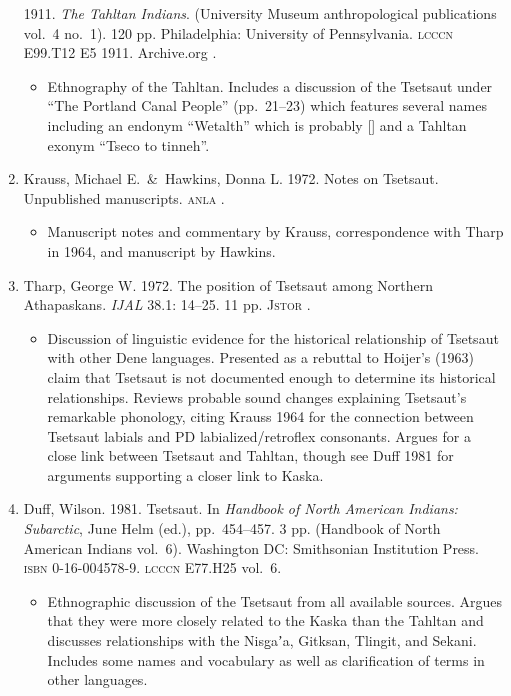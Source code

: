 \documentclass[12pt,letterpaper,oneside,article]{memoir}
\begin{document}
\begin{enumerate}
	1911.
	\textit{The Tahltan Indians}.
	(University Museum anthropological publications vol.\ 4 no.\ 1).
	120 pp. 
	Philadelphia: University of Pennsylvania.
	\textsc{lcccn} E99.T12 E5 1911.
	Archive.org .
	\begin{itemize}
	\item	Ethnography of the Tahltan.
		Includes a discussion of the Tsetsaut under “The Portland Canal People”
		(pp.\ 21–23) which features several names including an endonym “Wetalth”
		which is probably  [] and a Tahltan exonym
		“Tseco to tinneh”.
	\end{itemize}
\item	Krauss, Michael E.\ \&\ Hawkins, Donna L.
	1972.
	Notes on Tsetsaut.
	Unpublished manuscripts.
	\textsc{anla} .
	\begin{itemize}
	\item	Manuscript notes and commentary by Krauss, correspondence with Tharp in
		1964, and manuscript by Hawkins.
	\end{itemize}
\item	Tharp, George W.
	1972.
	The position of Tsetsaut among Northern Athapaskans.
	\textit{IJAL} 38.1: 14–25.
	11 pp.
	\textsc{Jstor} .
	\begin{itemize}
	\item	Discussion of linguistic evidence for the historical relationship of Tsetsaut
		with other Dene languages.
		Presented as a rebuttal to Hoijer’s (1963) claim that Tsetsaut is not documented
		enough to determine its historical relationships.
		Reviews probable sound changes explaining Tsetsaut’s remarkable phonology,
		citing Krauss 1964 for the connection between Tsetsaut labials and PD
		labialized/retroflex consonants.
		Argues for a close link between Tsetsaut and Tahltan, though see Duff 1981
		for arguments supporting a closer link to Kaska.
	\end{itemize}
\item	Duff, Wilson.
	1981.
	Tsetsaut.
	In \textit{Handbook of North American Indians: Subarctic},
	June Helm (ed.), pp.\ 454–457.
	3 pp.
	(Handbook of North American Indians vol.\ 6).
	Washington DC: Smithsonian Institution Press.
	\textsc{isbn} 0-16-004578-9.
	\textsc{lcccn} E77.H25 vol.\ 6.
	\begin{itemize}
	\item	Ethnographic discussion of the Tsetsaut from all available sources.
		Argues that they were more closely related to the Kaska than the Tahltan
		and discusses relationships with the Nisg̱aʼa, Gitksan, Tlingit, and Sekani.
		Includes some names and vocabulary as well as clarification of terms in
		other languages.
	\end{itemize}
\end{enumerate}
\end{document}
